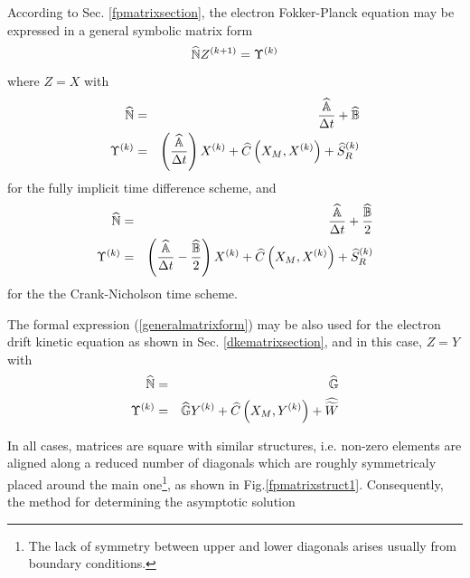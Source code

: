 
\label{LUsection}According to Sec. \ref{fpmatrixsection}, the
electron Fokker-Planck equation may be expressed in a general
symbolic matrix form
\begin{equation}
\widehat{\Bbb{N}}Z^{(k+1)}=\Upsilon ^{(k)}  \label{generalmatrixform}
\end{equation}
where $Z=X$ with
\begin{eqnarray}
\widehat{\Bbb{N}} &=&\frac{\widehat{\Bbb{A}}}{\Delta t}+\widehat{\Bbb{B}} \\
\Upsilon ^{(k)} &=&\left( \frac{\widehat{\Bbb{A}}}{\Delta t}\right) X^{(k)}+%
\widehat{C}\left( X_{M},X^{(k)}\right) +\widehat{S}_{R}^{(k)}
\end{eqnarray}
for the fully implicit time difference scheme, and
\begin{eqnarray}
\widehat{\Bbb{N}} &=&\frac{\widehat{\Bbb{A}}}{\Delta t}+\frac{\widehat{\Bbb{B%
}}}{2} \\
\Upsilon ^{(k)} &=&\left( \frac{\widehat{\Bbb{A}}}{\Delta t}-\frac{\widehat{%
\Bbb{B}}}{2}\right) X^{(k)}+\widehat{C}\left( X_{M},X^{(k)}\right) +\widehat{S}_{R}^{(k)}
\end{eqnarray}
for the the Crank-Nicholson time scheme.

The formal expression (\ref{generalmatrixform}) may be also used for the
electron drift kinetic equation as shown in Sec. \ref{dkematrixsection}, and
in this case, $Z=Y$ with
\begin{eqnarray}
\widehat{\Bbb{N}} &=&\widehat{\Bbb{G}} \\
\Upsilon ^{(k)} &=&\widehat{\Bbb{G}}Y^{(k)}+\widehat{C}\left(
X_{M},Y^{(k)}\right) +\widehat{\widetilde{W}}
\end{eqnarray}

In all cases, matrices are square with similar structures, i.e. non-zero
elements are aligned along a reduced number of diagonals which are roughly
symmetricaly placed around the main one\footnote{%
The lack of symmetry between upper and lower diagonals arises usually from
boundary conditions.}, as shown in Fig.\ref{fpmatrixstruct1}. Consequently,
the method for determining the asymptotic solution

%

